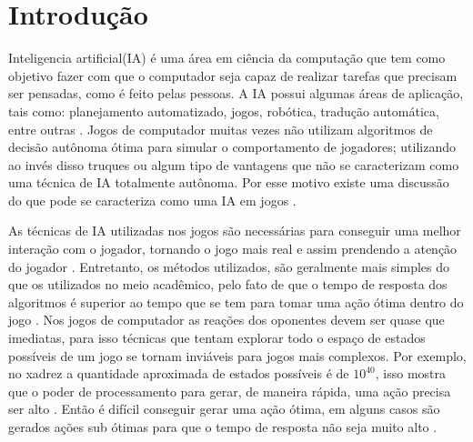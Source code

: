 \chapter{\label{chap:intro}Introdução}

Inteligencia artificial(IA) é uma área em ciência da computação que tem como objetivo fazer com que o computador seja capaz de realizar tarefas que precisam ser pensadas, como é feito pelas pessoas.  
A IA possui algumas áreas de aplicação, tais como: planejamento automatizado, jogos, robótica, tradução automática, entre outras \cite{intelligence2003modern}. 
Jogos de computador muitas vezes não utilizam algoritmos de decisão autônoma ótima para simular o comportamento de jogadores; utilizando ao invés disso truques ou algum tipo de vantagens que não se caracterizam como uma técnica de IA totalmente autônoma. 
Por esse motivo existe uma discussão do que pode se caracteriza como uma IA em jogos \cite{millington2009artificial}. 

As técnicas de IA utilizadas nos jogos são necessárias para conseguir uma melhor interação com o jogador, tornando o jogo mais real e assim prendendo a atenção do jogador \cite{millington2009artificial}. 
Entretanto, os métodos utilizados, são geralmente mais simples do que os utilizados no meio acadêmico, pelo fato de que o tempo de resposta dos algoritmos é superior ao tempo que se tem para tomar uma ação ótima dentro do jogo \cite{intelligence2003modern}. 
Nos jogos de computador as reações dos oponentes devem ser quase que imediatas, para isso técnicas que tentam explorar todo o espaço de estados possíveis de um jogo se tornam inviáveis para jogos mais complexos. 
Por exemplo, no xadrez a quantidade aproximada de estados possíveis é de $10^{40}$, isso mostra que o poder de processamento para gerar, de maneira rápida, uma ação precisa ser alto \cite{millington2009artificial}. 
Então é difícil conseguir gerar uma ação ótima, em alguns casos são gerados ações sub ótimas para que o tempo de resposta não seja muito alto \cite{intelligence2003modern}. 

